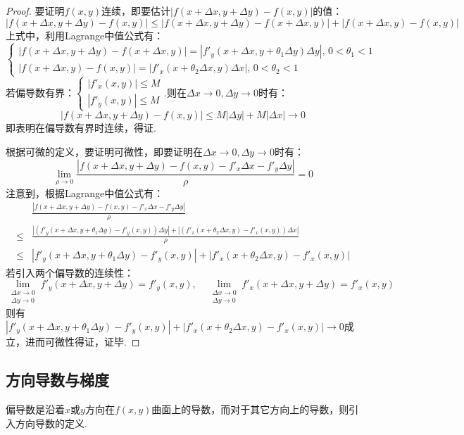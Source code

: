 \begin{proof}
    要证明$f(x,y)$连续，即要估计$|f(x+\Delta x,y+\Delta y) - f(x,y)|$的值：
    \[|f(x+\Delta x,y+\Delta y) - f(x,y)| \!\!\leqslant\!\! |f(x+\Delta x,y+\Delta y) - f(x+\Delta x,y)| + |f(x+\Delta x,y) - f(x,y)|\]
    上式中，利用Lagrange中值公式有：
    \[\begin{cases}
        |f(x+\Delta x,y+\Delta y) - f(x+\Delta x,y)| = |f'_y(x+\Delta x,y+\theta_1\Delta y)\Delta y|,\,0<\theta_1<1\\
        |f(x+\Delta x,y) - f(x,y)| = |f'_x(x+\theta_2\Delta x,y)\Delta x|,\,0<\theta_2<1
    \end{cases}\]
    若偏导数有界：$\begin{cases}
        |f'_x(x,y)|\leqslant M\\
        |f'_y(x,y)|\leqslant M
    \end{cases}$.则在$\Delta x \to 0,\Delta y \to 0$时有：
    \[|f(x+\Delta x,y+\Delta y) - f(x,y)| \leqslant M|\Delta y| + M|\Delta x| \to 0\]
    即表明在偏导数有界时连续，得证.

    根据可微的定义，要证明可微性，即要证明在$\Delta x \to 0,\Delta y \to 0$时有：
    \[\lim_{\rho \to 0}\frac{|f(x+\Delta x,y+\Delta y) - f(x,y) - f'_x \Delta x - f'_y \Delta y|}{\rho} = 0\]
    注意到，根据Lagrange中值公式有：
    \begin{align*}
        &\frac{|f(x+\Delta x,y+\Delta y) - f(x,y) - f'_x \Delta x - f'_y \Delta y|}{\rho} \\
        \leqslant & \frac{|(f'_y(x+\Delta x,y+\theta_1\Delta y)-f'_y(x,y))\Delta y| + |(f'_x(x+\theta_2\Delta x,y)-f'_x(x,y))\Delta x|}{\rho} \\
        \leqslant & |f'_y(x+\Delta x,y+\theta_1\Delta y)-f'_y(x,y)| + |f'_x(x+\theta_2\Delta x,y)-f'_x(x,y)|
    \end{align*}
    若引入两个偏导数的连续性：
    \[\lim_{\substack{\Delta x \to 0 \\ \Delta y \to 0}}f'_y(x+\Delta x,y+\Delta y) = f'_y(x,y),\quad \lim_{\substack{\Delta x \to 0 \\ \Delta y \to 0}}f'_x(x+\Delta x,y+\Delta y) = f'_x(x,y)\]
    则有$|f'_y(x+\Delta x,y+\theta_1\Delta y)-f'_y(x,y)| + |f'_x(x+\theta_2\Delta x,y)-f'_x(x,y)| \to 0$成立，进而可微性得证，证毕.
\end{proof}


\subsection{方向导数与梯度}
偏导数是沿着$x$或$y$方向在$f(x,y)$曲面上的导数，而对于其它方向上的导数，则引入方向导数的定义.

